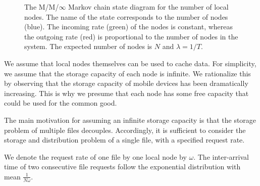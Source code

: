 \documentclass[10pt,conference]{IEEEtran}
\begin{document}
\begin{figure}[b]
\begin{center}
\end{center}
\caption{The M/M/$\infty$ Markov chain state diagram for the number of local nodes. The name of the state corresponds to the number of nodes (blue). The incoming rate (green) of the nodes is constant, whereas the outgoing rate (red) is proportional to the number of nodes in the system. The expected number of nodes is $N$ and $\lambda=1/T$.}
\label{mchain}
\end{figure}

We assume that local nodes themselves can be used to cache
data. For simplicity, we assume that the storage capacity of each node
is infinite. We rationalize this by observing that the storage capacity of mobile devices has been dramatically increasing. This is why we presume that each node has some free
capacity that could be used for the common good.

The main motivation for assuming an infinite
storage capacity is that the storage problem of multiple files
decouples. Accordingly, it is sufficient to consider the storage
and distribution problem of a single file, with a specified request rate.

We denote the request rate of one file by one local node by $\omega$. The
inter-arrival time of two consecutive file requests follow the
exponential distribution with mean $\frac{1}{N\omega}$.
\end{document}
